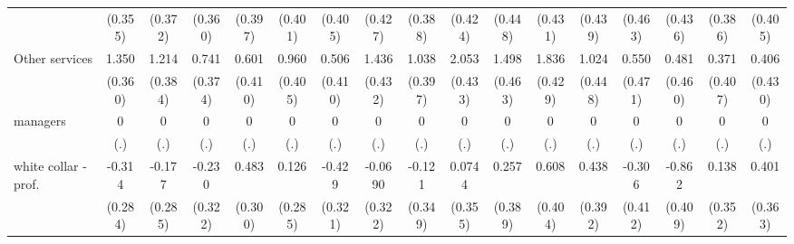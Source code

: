 {\begin{tabular}{l*{16}{c}}
                    &     (0.355)         &     (0.372)         &     (0.360)         &     (0.397)         &     (0.401)         &     (0.405)         &     (0.427)         &     (0.388)         &     (0.424)         &     (0.448)         &     (0.431)         &     (0.439)         &     (0.463)         &     (0.436)         &     (0.386)         &     (0.405)         \\
[1em]
Other services      &       1.350\sym{***}&       1.214\sym{**} &       0.741\sym{*}  &       0.601         &       0.960\sym{*}  &       0.506         &       1.436\sym{***}&       1.038\sym{**} &       2.053\sym{***}&       1.498\sym{**} &       1.836\sym{***}&       1.024\sym{*}  &       0.550         &       0.481         &       0.371         &       0.406         \\
                    &     (0.360)         &     (0.384)         &     (0.374)         &     (0.410)         &     (0.405)         &     (0.410)         &     (0.432)         &     (0.397)         &     (0.433)         &     (0.463)         &     (0.429)         &     (0.448)         &     (0.471)         &     (0.460)         &     (0.407)         &     (0.430)         \\
[1em]
managers            &           0         &           0         &           0         &           0         &           0         &           0         &           0         &           0         &           0         &           0         &           0         &           0         &           0         &           0         &           0         &           0         \\
                    &         (.)         &         (.)         &         (.)         &         (.)         &         (.)         &         (.)         &         (.)         &         (.)         &         (.)         &         (.)         &         (.)         &         (.)         &         (.)         &         (.)         &         (.)         &         (.)         \\
[1em]
white collar - prof.&      -0.314         &      -0.177         &      -0.230         &       0.483         &       0.126         &      -0.429         &     -0.0690         &      -0.121         &      0.0744         &       0.257         &       0.608         &       0.438         &      -0.306         &      -0.862\sym{*}  &       0.138         &       0.401         \\
                    &     (0.284)         &     (0.285)         &     (0.322)         &     (0.300)         &     (0.285)         &     (0.321)         &     (0.322)         &     (0.349)         &     (0.355)         &     (0.389)         &     (0.404)         &     (0.392)         &     (0.412)         &     (0.409)         &     (0.352)         &     (0.363)         \\

\end{tabular}}
